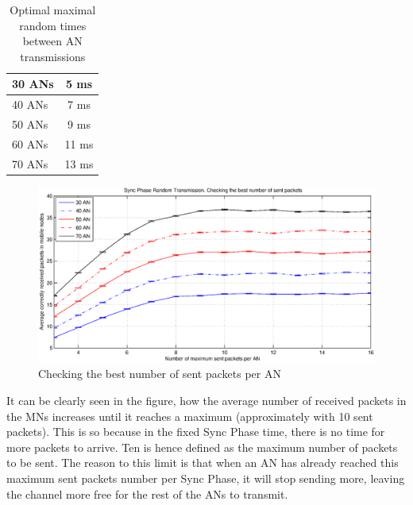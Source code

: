 \begin{table}
 \begin{center}
  \begin{tabular}{|l|c|}
   \hline
   30 \acp{AN} & 5 ms \\
   \hline
   40 \acp{AN} & 7 ms \\
   \hline
   50 \acp{AN} & 9 ms \\
   \hline
   60 \acp{AN} & 11 ms \\
   \hline
   70 \acp{AN} & 13 ms \\
   \hline
  \end{tabular}
  \caption{Optimal maximal random times between \ac{AN} transmissions}
  \label{tab:optimalTransmitTimes}
 \end{center}
\end{table}

\begin{figure}[ht]
 \begin{center}
  \includegraphics[width=1\textwidth]{randomTimeCheckingTheBestNumberOfSentPacketsForAnchor.eps}
 \end{center}
 \caption{Checking the best number of sent packets per \ac{AN}}
 \label{fig:randomTimeCheckingTheBestNumberOfSentPacketsForAnchor}
\end{figure}

It can be clearly seen in the figure, how the average number of received packets in the \acp{MN} increases until it reaches a maximum (approximately
with 10 sent packets). This is so because in the fixed Sync Phase time, there is no time for more packets to arrive. Ten is hence defined as the 
maximum number of packets to be sent. The reason to this limit is that when an \ac{AN} has already reached this maximum sent packets number per Sync Phase, 
it will stop sending more, leaving the channel more free for the rest of the \acp{AN} to transmit.

